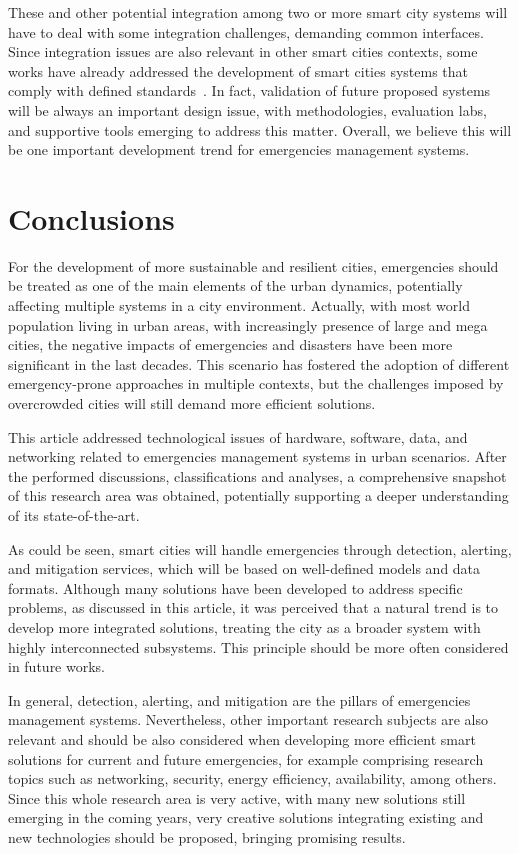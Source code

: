 \begin{refsection}
These and other potential integration among two or more smart city systems will have to deal with some integration challenges, demanding common interfaces. Since integration issues are also relevant in other smart cities contexts, some works have already addressed the development of smart cities systems that comply with defined standards~\cite{snap4city,validation1}. In fact, validation of future proposed systems will be always an important design issue, with methodologies, evaluation labs, and supportive tools emerging to address this matter. Overall, we believe this will be one important development trend for emergencies management systems.

\section{Conclusions}\label{conclusion}

For the development of more sustainable and resilient cities, emergencies should be treated as one of the main elements of the urban dynamics, potentially affecting multiple systems in a city environment. Actually, with most world population living in urban areas, with increasingly presence of large and mega cities, the negative impacts of emergencies and disasters have been more significant in the last decades. This scenario has fostered the adoption of different emergency-prone approaches in multiple contexts, but the challenges imposed by overcrowded cities will still demand more efficient solutions.

This article addressed technological issues of hardware, software, data, and networking related to emergencies management systems in urban scenarios. After the performed discussions, classifications and analyses, a comprehensive snapshot of this research area was obtained, potentially supporting a deeper understanding of its state-of-the-art.

As could be seen, smart cities will handle emergencies through detection, alerting, and mitigation services, which will be based on well-defined models and data formats. Although many solutions have been developed to address specific problems, as discussed in this article, it was perceived that a natural trend is to develop more integrated solutions, treating the city as a broader system with highly interconnected subsystems. This principle should be more often considered in future works. 

In general, detection, alerting, and mitigation are the pillars of emergencies management systems. Nevertheless, other important research subjects are also relevant and should be also considered when developing more efficient smart solutions for current and future emergencies, for example comprising research topics such as networking, security, energy efficiency, availability, among others. Since this whole research area is very active, with many new solutions still emerging in the coming years, very creative solutions integrating existing and new technologies should be proposed, bringing promising results.

\printbibliography[heading=subbibliography]
\end{refsection}
